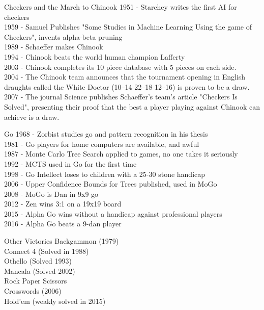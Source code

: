 \documentclass{powerdot}
\begin{document}
\begin{slide}{Checkers and the March to Chinook}
  1951 - Starchey writes the first AI for checkers \\
  1959 - Samuel Publishes "Some Studies in Machine Learning Using the game of Checkers", invents alpha-beta pruning\\
  1989 - Schaeffer makes Chinook\\
  1994 - Chinook beats the world human champion Lafferty\\
  2003 - Chinook completes its 10 piece database with 5 pieces on each side.\\
  2004 - The Chinook team announces that the tournament opening in English draughts called the White Doctor (10–14 22–18 12–16) is proven to be a draw.\\
  2007 - The journal Science publishes Schaeffer's team's article "Checkers Is Solved", presenting their proof that the best a player playing against Chinook can achieve is a draw.
\end{slide}

\begin{slide}{Go}
  1968 - Zorbist studies go and pattern recognition in his thesis \\
  1981 - Go players for home computers are available, and awful\\
  1987 - Monte Carlo Tree Search applied to games, no one takes it seriously\\
  1992 - MCTS used in Go for the first time\\
  1998 - Go Intellect loses to children with a 25-30 stone handicap\\
  2006 - Upper Confidence Bounds for Trees published, used in MoGo\\
  2008 - MoGo is Dan in 9x9 go\\
  2012 - Zen wins 3:1 on a 19x19 board\\
  2015 - Alpha Go wins without a handicap against professional players\\
  2016 - Alpha Go beats a 9-dan player
\end{slide}

\begin{slide}{Other Victories}
Backgammon (1979)\\
Connect 4 (Solved in 1988)\\
Othello (Solved 1993)\\
Mancala (Solved 2002)\\
Rock Paper Scissors\\
Crosswords (2006)\\
Hold'em (weakly solved in 2015)
\end{slide}
\end{document}
